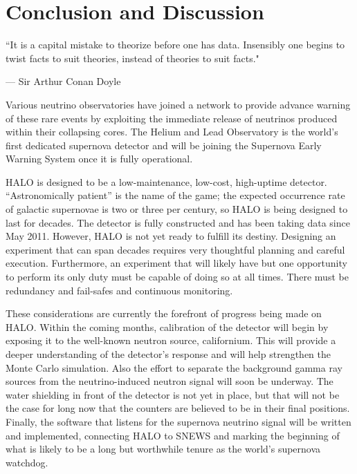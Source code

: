 %
%
%
%


\chapter{Conclusion and Discussion}
	\label{conclusion_chapter}
	\vspace{-0.2in}

	\begin{quoting}
		\noindent \large ``It is a capital mistake to theorize before one has data. Insensibly one begins to twist facts to suit theories, instead of theories to suit facts." \normalsize

		--- Sir Arthur Conan Doyle
	\end{quoting}

	 Various neutrino observatories have joined a network to provide advance warning of these rare events by exploiting the immediate release of neutrinos produced within their collapsing cores. The Helium and Lead Observatory is the world's first dedicated supernova detector and will be joining the Supernova Early Warning System once it is fully operational.

	HALO is designed to be a low-maintenance, low-cost, high-uptime detector. ``Astronomically patient'' is the name of the game; the expected occurrence rate of galactic supernovae is two or three per century, so HALO is being designed to last for decades. The detector is fully constructed and has been taking data since May 2011. However, HALO is not yet ready to fulfill its destiny. Designing an experiment that can span decades requires very thoughtful planning and careful execution. Furthermore, an experiment that will likely have but one opportunity to perform its only duty must be capable of doing so at all times. There must be redundancy and fail-safes and continuous monitoring. 

	These considerations are currently the forefront of progress being made on HALO. Within the coming months, calibration of the detector will begin by exposing it to the well-known neutron source, californium. This will provide a deeper understanding of the detector's response and will help strengthen the Monte Carlo simulation. Also the effort to separate the background gamma ray sources from the neutrino-induced neutron signal will soon be underway. The water shielding in front of the detector is not yet in place, but that will not be the case for long now that the \he counters are believed to be in their final positions. Finally, the software that listens for the supernova neutrino signal will be written and implemented, connecting HALO to SNEWS and marking the beginning of what is likely to be a long but worthwhile tenure as the world's supernova watchdog. 

